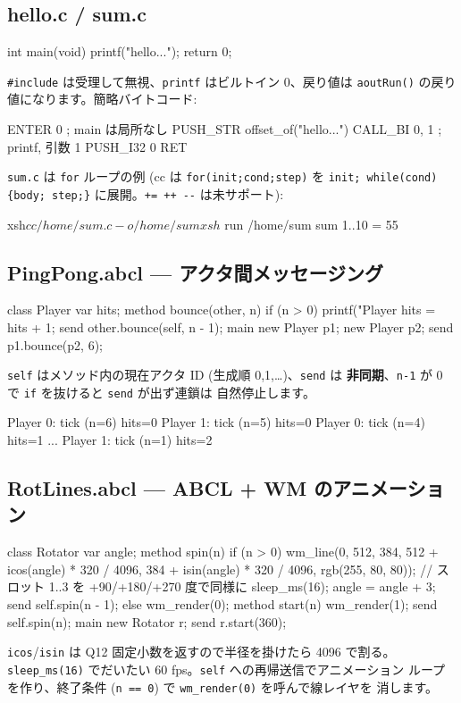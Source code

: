 \documentclass[a4paper,11pt]{ltjsarticle}
\begin{document}
\subsection{hello.c / sum.c}
\begin{code}
int main(void) { printf("hello...\n"); return 0; }
\end{code}
\verb|#include| は受理して無視、\verb|printf| はビルトイン 0、戻り値は
\verb|aoutRun()| の戻り値になります。簡略バイトコード:
\begin{code}
ENTER 0                         ; main は局所なし
PUSH_STR offset_of("hello...\n")
CALL_BI 0, 1                    ; printf, 引数 1
PUSH_I32 0
RET
\end{code}
\verb|sum.c| は \verb|for| ループの例 (cc は \verb|for(init;cond;step)| を
\verb|init; while(cond){body; step;}| に展開。\verb|+= ++ --| は未サポート):
\begin{code}
xsh$ cc /home/sum.c -o /home/sum
xsh$ run /home/sum
sum 1..10 = 55
\end{code}

\subsection{PingPong.abcl --- アクタ間メッセージング}
\begin{code}
class Player {
    var hits;
    method bounce(other, n) {
        if (n > 0) {
            printf("Player %
            hits = hits + 1;
            send other.bounce(self, n - 1);
        }
    }
}
main { new Player p1; new Player p2; send p1.bounce(p2, 6); }
\end{code}
\verb|self| はメソッド内の現在アクタ ID (生成順 0,1,\dots)、\verb|send| は
\textbf{非同期}、\verb|n-1| が 0 で \verb|if| を抜けると \verb|send| が出ず連鎖は
自然停止します。
\begin{code}
Player 0: tick (n=6) hits=0
Player 1: tick (n=5) hits=0
Player 0: tick (n=4) hits=1
...
Player 1: tick (n=1) hits=2
\end{code}

\subsection{RotLines.abcl --- ABCL + WM のアニメーション}
\begin{code}
class Rotator {
    var angle;
    method spin(n) {
        if (n > 0) {
            wm_line(0, 512, 384,
                    512 + icos(angle) * 320 / 4096,
                    384 + isin(angle) * 320 / 4096, rgb(255, 80, 80));
            // スロット 1..3 を +90/+180/+270 度で同様に
            sleep_ms(16);
            angle = angle + 3;
            send self.spin(n - 1);
        } else { wm_render(0); }
    }
    method start(n) { wm_render(1); send self.spin(n); }
}
main { new Rotator r; send r.start(360); }
\end{code}
\verb|icos|/\verb|isin| は Q12 固定小数を返すので半径を掛けたら 4096 で割る。
\verb|sleep_ms(16)| でだいたい 60 fps。\verb|self| への再帰送信でアニメーション
ループを作り、終了条件 (\verb|n == 0|) で \verb|wm_render(0)| を呼んで線レイヤを
消します。
\end{document}
